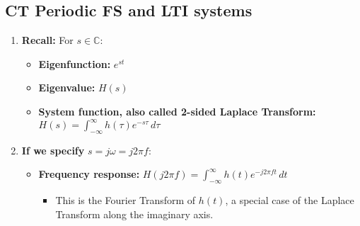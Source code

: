 \subsection{CT Periodic FS and LTI systems}
\begin{definition}
    
\end{definition}

\begin{derivation}
    \begin{enumerate}
        \item \textbf{Recall:} For \( s \in \mathbb{C} \):

        \begin{center}
        \end{center}
        \begin{itemize}
            \item \textbf{Eigenfunction:} $e^{st}$
            \item \textbf{Eigenvalue:} $H(s)$
            \item \textbf{System function, also called 2-sided Laplace Transform:} $H(s) = \int_{-\infty}^{\infty} h(\tau) e^{-s \tau} \, d\tau$ 
        \end{itemize}

        \item \textbf{If we specify} \( s = j \omega = j 2 \pi f \):

        \begin{center}
        \end{center}
        \begin{itemize}
            \item \textbf{Frequency response:} $H(j 2 \pi f) = \int_{-\infty}^{\infty} h(t) e^{-j 2 \pi f t} \, dt$
            \begin{itemize}
                \item This is the Fourier Transform of \( h(t) \), a special case of the Laplace Transform along the imaginary axis.
            \end{itemize}
        \end{itemize}


\end{enumerate}
\end{derivation}
